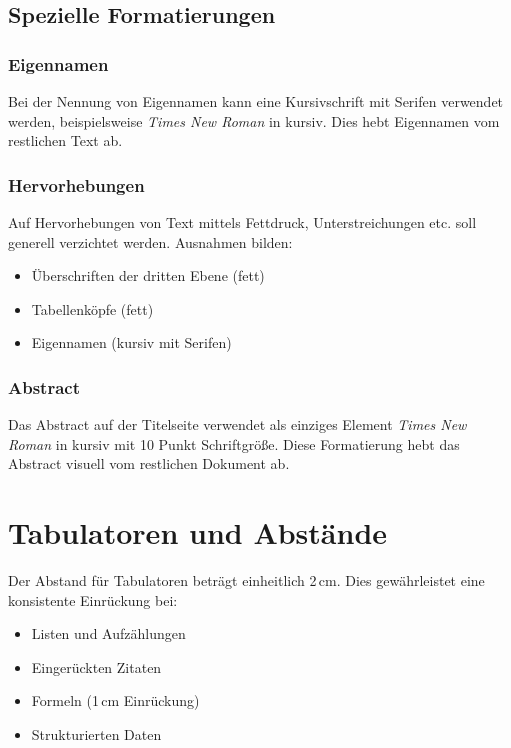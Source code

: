 \subsection*{Spezielle Formatierungen}
\label{subsec:spezielle_formatierungen}

\subsubsection{Eigennamen}
Bei der Nennung von Eigennamen kann eine Kursivschrift mit Serifen verwendet werden, beispielsweise \emph{Times New Roman} in kursiv. Dies hebt Eigennamen vom restlichen Text ab.

\subsubsection{Hervorhebungen}
Auf Hervorhebungen von Text mittels Fettdruck, Unterstreichungen etc. soll generell verzichtet werden. Ausnahmen bilden:
\begin{itemize}
	\item Überschriften der dritten Ebene (fett)
	\item Tabellenköpfe (fett)
	\item Eigennamen (kursiv mit Serifen)
\end{itemize}

\subsubsection{Abstract}
Das Abstract auf der Titelseite verwendet als einziges Element \emph{Times New Roman} in kursiv mit 10 Punkt Schriftgröße. Diese Formatierung hebt das Abstract visuell vom restlichen Dokument ab.

\section{Tabulatoren und Abstände}
\label{sec:tabulatoren}

Der Abstand für Tabulatoren beträgt einheitlich 2\,cm. Dies gewährleistet eine konsistente Einrückung bei:
\begin{itemize}
	\item Listen und Aufzählungen
	\item Eingerückten Zitaten
	\item Formeln (1\,cm Einrückung)
	\item Strukturierten Daten
\end{itemize}

